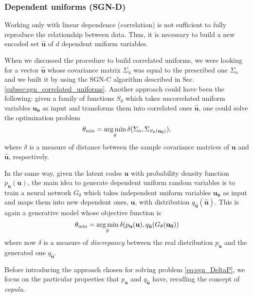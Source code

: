 \subsubsection{Dependent uniforms (SGN-D)}
\label{subsec:sgn_dependent_uniforms}

Working only with linear dependence (correlation) is not sufficient to fully reproduce the relationship between data. Thus, it is necessary to build a new encoded set $\mathbf{\hat{u}}$ of $d$ dependent uniform variables.  

When we discussed the procedure to build correlated uniforms, we were looking for a vector $\mathbf{\hat{u}}$ whose covariance matrix $\Sigma_{\hat{u}}$ was equal to the prescribed one $\Sigma_u$ and we built it by using the SGN-C algorithm described in Sec. \ref{subsec:sgn_correlated_uniforms}. Another approach could have been the following: given a family of functions $S_{\theta}$ which takes uncorrelated uniform variables $\mathbf{u_0}$ as input and transforms them into correlated ones $\mathbf{\hat{u}}$, one could solve the optimization problem
\begin{equation}
\theta_{\min} = \operatorname*{arg\,min}_{\theta} \delta(\Sigma_u, \Sigma_{S_{\theta}(\mathbf{u_0})}),
\label{eq:sgn_DeltaSigma}
\end{equation}
where $\delta$ is a measure of distance between the sample covariance matrices of $\mathbf{u}$ and $\mathbf{\hat{u}}$, respectively.

In the same way, given the latent codes $\mathbf{u}$ with probability density function $p_{\mathbf{u}}(\mathbf{u})$, the main idea to generate dependent uniform random variables is to train a neural network $G_{\theta}$ which takes independent uniform variables $\mathbf{u_0}$ as input and maps them into new dependent ones, $\mathbf{\hat{u}}$, with distribution $q_{\mathbf{\hat{u}}}(\mathbf{\hat{u}})$. This is again a generative model whose objective function is
\begin{equation}
\theta_{\min} = \operatorname*{arg\,min}_{\theta} \delta(p_{\mathbf{u}}(\mathbf{u}), q_{\mathbf{\hat{u}}}(G_{\theta}(\mathbf{u_0}))
\label{eq:sgn_DeltaP}
\end{equation}
where now $\delta$ is a measure of \textit{discrepancy} between the real distribution $p_{\mathbf{u}}$ and the generated one $q_{\mathbf{\hat{u}}}$.

Before introducing the approach chosen for solving problem \eqref{eq:sgn_DeltaP}, we focus on the particular properties that $p_{\mathbf{u}}$ and $q_{\mathbf{\hat{u}}}$ have, recalling the concept of \textit{copula}.


